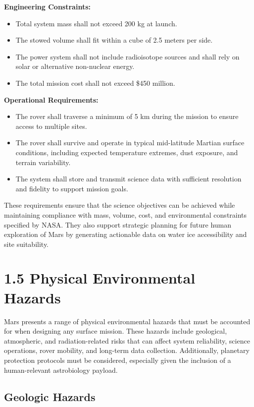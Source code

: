 \documentclass[12pt]{article}
\begin{document}
\textbf{Engineering Constraints:}
\begin{itemize}
    \item Total system mass shall not exceed 200 kg at launch.
    \item The stowed volume shall fit within a cube of 2.5 meters per side.
    \item The power system shall not include radioisotope sources and shall rely on solar or alternative non-nuclear energy.
    \item The total mission cost shall not exceed \$450 million.
\end{itemize}

\textbf{Operational Requirements:}
\begin{itemize}
    \item The rover shall traverse a minimum of 5 km during the mission to ensure access to multiple sites.
    \item The rover shall survive and operate in typical mid-latitude Martian surface conditions, including expected temperature extremes, dust exposure, and terrain variability.
    \item The system shall store and transmit science data with sufficient resolution and fidelity to support mission goals.
\end{itemize}

These requirements ensure that the science objectives can be achieved while maintaining compliance with mass, volume, cost, and environmental constraints specified by NASA. They also support strategic planning for future human exploration of Mars by generating actionable data on water ice accessibility and site suitability.

\section*{1.5 Physical Environmental Hazards}

Mars presents a range of physical environmental hazards that must be accounted for when designing any surface mission. These hazards include geological, atmospheric, and radiation-related risks that can affect system reliability, science operations, rover mobility, and long-term data collection. Additionally, planetary protection protocols must be considered, especially given the inclusion of a human-relevant astrobiology payload.

\subsection*{Geologic Hazards}
\end{document}
